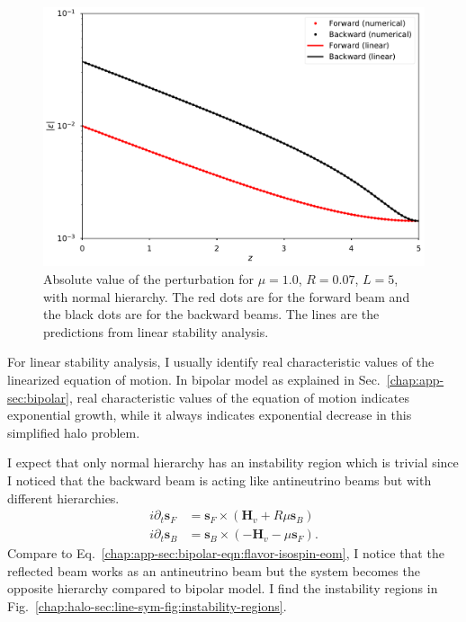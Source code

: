 \begin{figure}[htbp]
    \centering
    \includegraphics[width=\textwidth]{chapters/assets/halo/thesis-mu-1-refl-0p07}
    \caption{Absolute value of the perturbation for $\mu=1.0$, $R=0.07$, $L=5$, with normal hierarchy. The red dots are for the forward beam and the black dots are for the backward beams. The lines are the predictions from linear stability analysis.}
    \label{chap:halo-sec:line-sym-fig:mu-1.0-reflection-0.07}
\end{figure}

For linear stability analysis, I usually identify real characteristic values of the linearized equation of motion. In bipolar model as explained in Sec.~\ref{chap:app-sec:bipolar}, real characteristic values of the equation of motion indicates exponential growth, while it always indicates exponential decrease in this simplified halo problem.

I expect that only normal hierarchy has an instability region which is trivial since I noticed that the backward beam is acting like antineutrino beams but with different hierarchies.
\begin{align}
 i \partial_t \mathbf s_F &= \mathbf s_F \times (\mathbf {H}_v +R \mu \mathbf s_B) \\
   i\partial_t \mathbf s_B &= \mathbf s_B \times (- \mathbf H_v - \mu \mathbf s_F) .
\end{align}
Compare to Eq.~\ref{chap:app-sec:bipolar-eqn:flavor-isospin-eom}, I notice that
the reflected beam works as an antineutrino beam but the system becomes the opposite hierarchy compared to bipolar model. I find the instability regions in Fig.~\ref{chap:halo-sec:line-sym-fig:instability-regions}.



